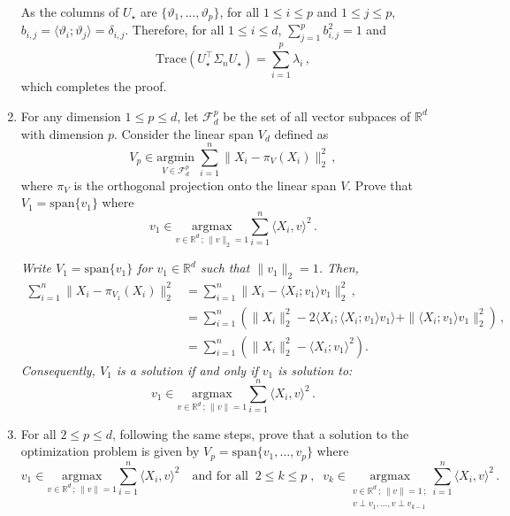 \documentclass[a4paper,10pt,fleqn]{article}
\newcommand{\eqsp}{\,}
\newcommand{\calF}{\mathcal{F}}
\newcommand{\rset}{\ensuremath{\mathbb{R}}}
\newcommand{\1}{\ensuremath{\mathbbm{1}}}
\newcommand{\bfU}{U}
\newcommand{\bfs}{\Sigma}
\begin{document}
\begin{enumerate}
{As the columns of $\bfU_{\star}$ are $\{\vartheta_1,\ldots,\vartheta_p\}$, for all $1\leqslant i\leqslant p$ and $1\leqslant j \leqslant p$, $b_{i,j} = \langle \vartheta_i;\vartheta_j\rangle = \delta_{i,j}$. Therefore,  for all $1\leqslant i\leqslant d$, $\sum_{j=1}^p b^2_{i,j} = 1$ and
$$
\mathrm{Trace}(\bfU^\top_{\star}\bfs_n \bfU_{\star}) =\sum_{i = 1}^p \lambda_i\eqsp,
$$
which completes the proof.
}
\item  For any dimension $1\leqslant p \leqslant  d$, let $\calF_d^p$ be the set of all vector subpaces of $\rset^d$ with dimension $p$. Consider the linear span $V_d$ defined as
$$
V_p \in \underset{V\in \calF_d^p}{\mathrm{argmin}} \;\sum_{i=1}^n\|X_i - \pi_V(X_i)\|_2^2\eqsp,
$$
where $\pi_V$ is the orthogonal projection onto the linear span $V$. Prove that $V_1 = \mathrm{span}\{v_1\}$ where
$$
v_1 \in \underset{v \in \rset^d\,;\, \|v\|_2=1}{\mathrm{argmax}} \sum_{i=1}^n   \langle X_i, v \rangle^2\eqsp.
$$

\vspace{.2cm}

{\em
Write $V_1 = \mathrm{span}\{v_1\}$ for $v_1\in \rset^d$ such that $\|v_1\|_2 = 1$. Then,
\begin{align*}
\sum_{i=1}^n\|X_i - \pi_{V_1}(X_i)\|_2^2 & = \sum_{i=1}^n\|X_i -  \langle X_i; v_1 \rangle v_1 \|_2^2\eqsp,\\
& = \sum_{i=1}^n \left( \|X_i\|_2^2 - 2 \langle X_i; \langle X_i; v_1 \rangle v_1 \rangle + \| \langle X_i; v_1 \rangle v_1 \|_2^2 \right)\eqsp,\\
& = \sum_{i=1}^n \left( \|X_i\|_2^2 -   \langle X_i; v_1 \rangle^2 \right).
\end{align*}
Consequently, $V_1$ is a solution  if and only if $v_1$ is solution to:
$$
v_1 \in \underset{v \in \rset^d\,;\, \|v\|=1}{\mathrm{argmax}} \sum_{i=1}^n   \langle X_i, v \rangle^2\eqsp.
$$
}
\item For all $2\leqslant p \leqslant d$, following the same steps, prove that a solution to the optimization problem is given by $V_p = \mathrm{span}\{v_1, \ldots, v_p\}$ where
\begin{equation}
\label{eq:vecpca}
v_1 \in \underset{v\in \rset^d\,;\,\|v\|=1}{\mathrm{argmax}} \sum_{i=1}^n\langle X_i,v\rangle^2 \quad\mbox{and for all}\;\; 2\leqslant k \leqslant p\;,\;\; v_k \in \underset{\substack{v\in \rset^d\,;\,\|v\|=1\,;\\ v\perp v_1,\ldots,v\perp v_{k-1}}}{\mathrm{argmax}}\sum_{i=1}^n\langle X_i,v\rangle^2\eqsp.
\end{equation}


\end{enumerate}
\end{document}
